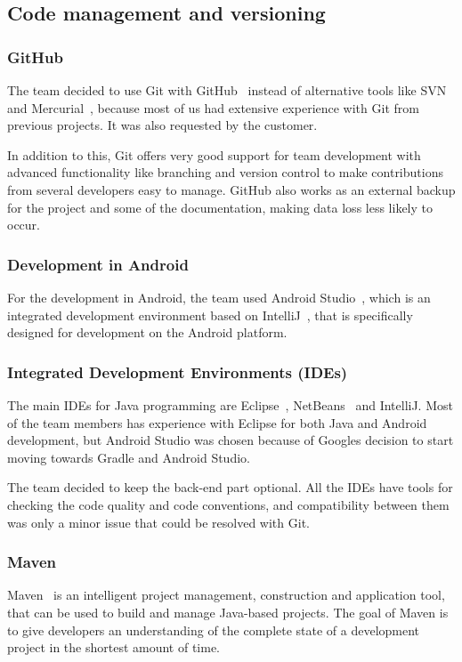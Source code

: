 \subsection{Code management and versioning}
\subsubsection{GitHub}
The team decided to use Git with GitHub~\cite{github} instead of alternative tools like SVN~\cite{svn} and Mercurial~\cite{mercurial}, because most of us had extensive experience with Git from previous projects. It was also requested by the customer. 

In addition to this, Git offers very good support for team development with advanced functionality like branching and version control to make contributions from several developers easy to manage. GitHub also works as an external backup for the project and some of the documentation, making data loss less likely to occur.

\subsubsection{Development in Android}
For the development in Android, the team used Android Studio~\cite{android-studio}, which is an integrated development environment based on IntelliJ~\cite{intellij}, that is specifically designed for development on the Android platform.

\subsubsection{Integrated Development Environments (IDEs)}
The main IDEs for Java programming are Eclipse~\cite{eclipse}, NetBeans~\cite{netbeans} and IntelliJ. Most of the team members has experience with Eclipse for both Java and Android development, but Android Studio was chosen because of Googles decision to start moving towards Gradle and Android Studio.

The team decided to keep the back-end part optional. All the IDEs have tools for checking the code quality and code conventions, and compatibility between them was only a minor issue that could be resolved with Git.

\subsubsection{Maven}
Maven~\cite{maven} is an intelligent project management, construction and application tool, that can be used to build and manage Java-based projects. The goal of Maven is to give developers an understanding of the complete state of a development project in the shortest amount of time.

